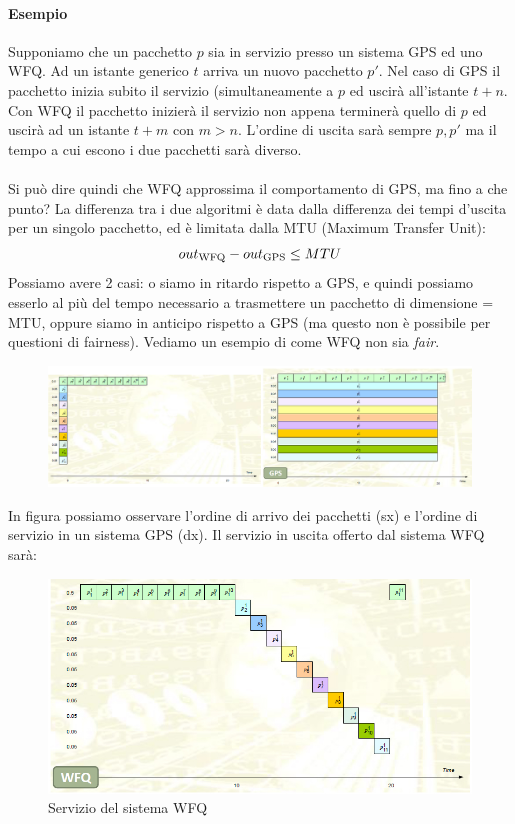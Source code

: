 \documentclass{article}
\begin{document}
\paragraph{Esempio} Supponiamo che un pacchetto \(p\) sia in servizio presso un sistema GPS ed uno WFQ. Ad un istante generico \(t\) arriva un nuovo pacchetto \(p'\). Nel caso di GPS il pacchetto inizia subito il servizio (simultaneamente a \(p\) ed uscirà all'istante \(t+n\). Con WFQ il pacchetto inizierà il servizio non appena terminerà quello di \(p\) ed uscirà ad un istante \(t+m\) con \( m>n\). L'ordine di uscita sarà sempre \(p, p'\) ma il tempo a cui escono i due pacchetti sarà diverso.\\ \\
Si può dire quindi che WFQ approssima il comportamento di GPS, ma fino a che punto? La differenza tra i due algoritmi è data dalla differenza dei tempi d'uscita per un singolo pacchetto, ed è limitata dalla MTU (Maximum Transfer Unit):
\[ out\textsubscript{WFQ} - out\textsubscript{GPS} \leq MTU \]
Possiamo avere 2 casi: o siamo in ritardo rispetto a GPS, e quindi possiamo esserlo al più del tempo necessario a trasmettere un pacchetto di dimensione = MTU, oppure siamo in anticipo rispetto a GPS (ma questo non è possibile per questioni di fairness). Vediamo un esempio di come WFQ non sia \textit{fair}.
\begin{figure}[H]
    \centering
    \includegraphics[scale=1.1]{figures/fairness1.jpg}
    \caption{}
\end{figure}
\noindent In figura possiamo osservare l'ordine di arrivo dei pacchetti (sx) e l'ordine di servizio in un sistema GPS (dx). Il servizio in uscita offerto dal sistema WFQ sarà:
\begin{figure}[H]
    \centering
    \includegraphics[scale=1.7]{figures/fairness2.jpg}
    \caption{Servizio del sistema WFQ}
\end{figure}
\end{document}

